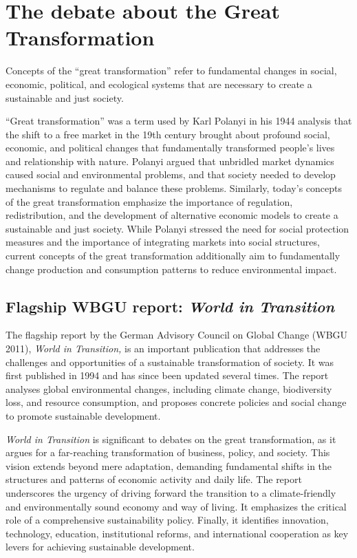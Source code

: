 \documentclass[
  a4paper,
  openany]{book}
\begin{document}
\section{The debate about the Great
Transformation}\label{the-debate-about-the-great-transformation}

Concepts of the ``great transformation'' refer to fundamental changes in
social, economic, political, and ecological systems that are necessary
to create a sustainable and just society.

``Great transformation'' was a term used by Karl Polanyi in his 1944
analysis that the shift to a free market in the 19th century brought
about profound social, economic, and political changes that
fundamentally transformed people's lives and relationship with nature.
Polanyi argued that unbridled market dynamics caused social and
environmental problems, and that society needed to develop mechanisms to
regulate and balance these problems. Similarly, today's concepts of the
great transformation emphasize the importance of regulation,
redistribution, and the development of alternative economic models to
create a sustainable and just society. While Polanyi stressed the need
for social protection measures and the importance of integrating markets
into social structures, current concepts of the great transformation
additionally aim to fundamentally change production and consumption
patterns to reduce environmental impact.

\subsection{\texorpdfstring{Flagship WBGU report: \emph{World in
Transition}}{Flagship WBGU report: World in Transition}}\label{flagship-wbgu-report-world-in-transition}

The flagship report by the German Advisory Council on Global Change
(WBGU 2011), \emph{World in Transition,} is an important publication
that addresses the challenges and opportunities of a sustainable
transformation of society. It was first published in 1994 and has since
been updated several times. The report analyses global environmental
changes, including climate change, biodiversity loss, and resource
consumption, and proposes concrete policies and social change to promote
sustainable development.

\emph{World in Transition} is significant to debates on the great
transformation, as it argues for a far-reaching transformation of
business, policy, and society. This vision extends beyond mere
adaptation, demanding fundamental shifts in the structures and patterns
of economic activity and daily life. The report underscores the urgency
of driving forward the transition to a climate-friendly and
environmentally sound economy and way of living. It emphasizes the
critical role of a comprehensive sustainability policy. Finally, it
identifies innovation, technology, education, institutional reforms, and
international cooperation as key levers for achieving sustainable
development.
\end{document}
